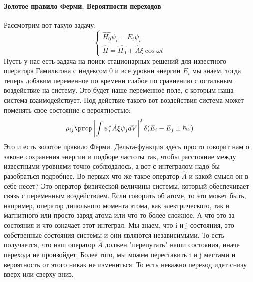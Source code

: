 \documentclass[12pt]{article}
\begin{document}
\paragraph{Золотое правило Ферми. Вероятности переходов}
Рассмотрим вот такую задачу:
\begin{equation*}
    \begin{cases}
    \hat{H_0}\psi_i=E_i\psi_i\\
    \hat{H}=\hat{H_0}+\hat{A}\xi \cos{\omega t}
    \end{cases}
\end{equation*}
Пусть у нас есть задача на поиск стационарных решений для известного оператора Гамильтона с индексом 0 и все уровни энергии $E_i$ мы знаем, тогда теперь добавим переменное по времени слабое по сравнению с остальным воздействие на систему. Это будет наше переменное поле, с которым наша система взаимодействует. Под действие такого вот воздействия система может поменять свое состояние с вероятностью:
\begin{equation*}
    \rho_{ij} \prop \left| \int \psi^*_i\hat{A}\xi\psi_j dV\right|^2 \delta (E_i-E_j \pm \hbar \omega)
\end{equation*}
Это и есть золотое правило Ферми. Дельта-функция здесь просто говорит нам о законе сохранения энергии и подборе частоты так, чтобы расстояние между известными уровнями точно соблюдалось, а вот с интегралом надо бы разобраться подробнее. Во-первых что же такое оператор $\hat{A}$ и какой смысл он в себе несет? Это оператор физической величины системы, который обеспечивает связь с переменным воздействием. Если говорить об атоме, то это может быть, например, оператор дипольного момента атома, как электрического, так и магнитного или просто заряд атома или что-то более сложное. А что это за состояния и что означает этот интеграл. Мы знаем, что i и j состояния, это собственные состояния системы и они являются независимыми. То есть получается, что наш оператор $\hat{A}$ должен "перепутать" наши состояния, иначе перехода не произойдет. Более того, мы можем переставить i и j местами и вероятность от этого никак не измениться. То есть неважно переход идет снизу вверх или сверху вниз.
\end{document}
